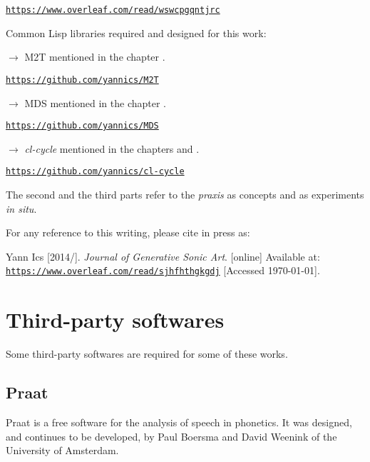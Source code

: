 \href{https://www.overleaf.com/read/wswcpgqntjrc}{\texttt{\small https://www.overleaf.com/read/wswcpgqntjrc}}

\bigskip
Common Lisp libraries required and designed for this work:

\smallskip

\noindent $\rightarrow$ M2T mentioned in the chapter \textsl{}.

\href{https://github.com/yannics/M2T}{\texttt{\small https://github.com/yannics/M2T}}

\smallskip

\noindent $\rightarrow$ MDS mentioned in the chapter  \textsl{}.

\href{https://github.com/yannics/MDS}{\texttt{\small https://github.com/yannics/MDS}}

\smallskip

\noindent $\rightarrow$ \textsl{cl-cycle} mentioned in the chapters \textsl{} and  \textsl{}. 

\href{https://github.com/yannics/cl-cycle}{\texttt{\small https://github.com/yannics/cl-cycle}}

\newpage
The second and the third parts refer to the \textit{praxis} as concepts and as experiments \textit{in situ}. 

\bigskip

For any reference to this writing, please cite in press as: 

\noindent Yann Ics [2014/\the\year]. \textit{Journal of Generative Sonic Art}. [online] Available at: \href{https://www.overleaf.com/read/sjhfhthgkgdj}{\texttt{\small https://www.overleaf.com/read/sjhfhthgkgdj}} [Accessed \today].

\section*{Third-party softwares}
\label{tps}

Some third-party softwares are required for some of these works. 

\subsection*{Praat}

Praat is a free software for the analysis of speech in phonetics. It was designed, and continues to be developed, by Paul Boersma and David Weenink of the University of Amsterdam. 

